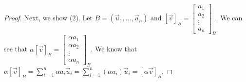 \begin{proof}
    Next, we show (2). Let $B=(\vec{u}_1,\ldots,\vec{u}_n)$ and $[\vec{v}]_B=\left[\begin{smallmatrix}
        a_1 \\ a_2 \\ \vdots \\ a_n
    \end{smallmatrix}\right]_B$. We can see that $\alpha[\vec{v}]_B=\left[\begin{smallmatrix}
        \alpha a_1 \\ \alpha a_2 \\ \vdots \\ \alpha a_n
    \end{smallmatrix}\right]_B$. We know that $\alpha[\vec{v}]_B=\sum_{i=1}^n\alpha a_i\vec{u}_i=\sum_{i=1}^n (\alpha a_i)\vec{u}_i=[\alpha\vec{v}]_B$.
\end{proof}